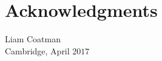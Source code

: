 
\bigskip

\begingroup
\let\clearpage\relax
\let\cleardoublepage\relax
\let\cleardoublepage\relax
\chapter*{Acknowledgments}







\begin{flushright}
Liam Coatman \\
Cambridge, April $2017$
\end{flushright}

\endgroup



